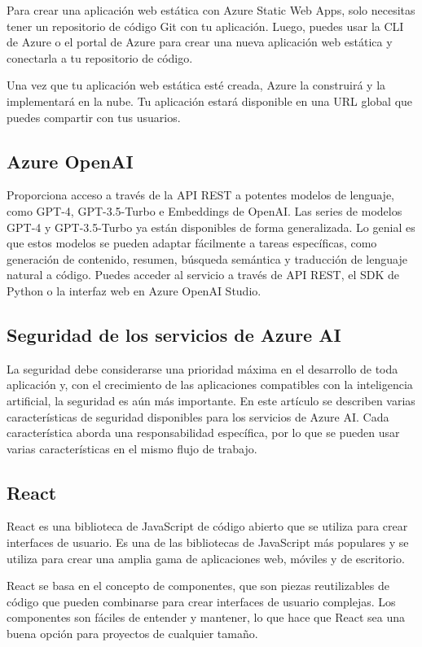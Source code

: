 Para crear una aplicación web estática con Azure Static Web Apps, solo necesitas tener un repositorio de código Git 
con tu aplicación. Luego, puedes usar la CLI de Azure o el portal de Azure para crear una nueva aplicación web estática 
y conectarla a tu repositorio de código.

Una vez que tu aplicación web estática esté creada, Azure la construirá y la implementará en la nube. Tu aplicación 
estará disponible en una URL global que puedes compartir con tus usuarios.


\subsection{Azure OpenAI}


Proporciona acceso a través de la API REST a potentes modelos de lenguaje, como GPT-4, GPT-3.5-Turbo e Embeddings de OpenAI. 
Las series de modelos GPT-4 y GPT-3.5-Turbo ya están disponibles de forma generalizada. Lo genial es que estos modelos se pueden 
adaptar fácilmente a tareas específicas, como generación de contenido, resumen, búsqueda semántica y traducción de 
lenguaje natural a código. Puedes acceder al servicio a través de API REST, el SDK de Python o la interfaz web en 
Azure OpenAI Studio.


\subsection{Seguridad de los servicios de Azure AI}

La seguridad debe considerarse una prioridad máxima en el desarrollo de toda aplicación y, con el crecimiento de las aplicaciones
compatibles con la inteligencia artificial, la seguridad es aún más importante. En este artículo se describen varias 
características de seguridad disponibles para los servicios de Azure AI. Cada característica aborda una responsabilidad 
específica, por lo que se pueden usar varias características en el mismo flujo de trabajo.

\subsection{React}

React es una biblioteca de JavaScript de código abierto que se utiliza para crear interfaces de usuario. Es una de las bibliotecas 
de JavaScript más populares y se utiliza para crear una amplia gama de aplicaciones web, móviles y de escritorio.

React se basa en el concepto de componentes, que son piezas reutilizables de código que pueden combinarse para 
crear interfaces de usuario complejas. Los componentes son fáciles de entender y mantener, lo que hace que React 
sea una buena opción para proyectos de cualquier tamaño.

